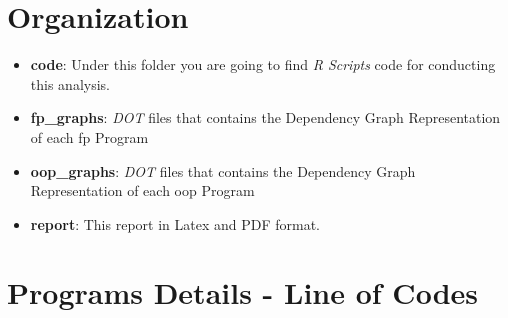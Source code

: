 \documentclass[12pt, a4paper]{article}
\begin{document}



\appendix
\section{Organization}\label{apx:sec:org:1}

\begin{itemize}
    \item \textbf{code}: Under this folder you are going to find \textit{R Scripts} code for conducting this analysis.
    \item \textbf{fp\_graphs}: \textit{DOT} files that contains the Dependency Graph Representation of each \acrlong{fp} Program
    \item \textbf{oop\_graphs}: \textit{DOT} files that contains the Dependency Graph Representation of each \acrlong{oop} Program
    \item \textbf{report}: This report in Latex and PDF format.
\end{itemize}

\section{Programs Details - Line of Codes}
\end{document}
